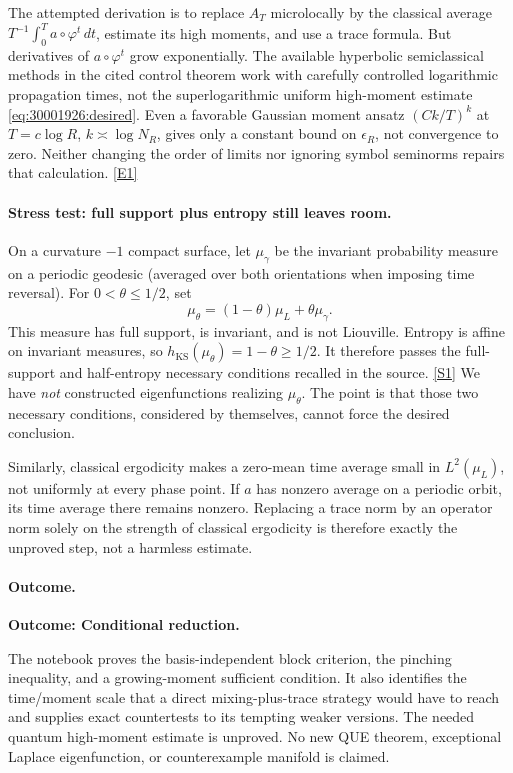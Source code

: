 \documentclass[11pt,a4paper]{article}
\newcommand{\sref}[2]{\hyperlink{source:#1:#2}{[S#2]}}
\newcommand{\eref}[2]{\hyperlink{extra:#1:#2}{[E#2]}}
\numberwithin{equation}{section}
\begin{document}
The attempted derivation is to replace $A_T$ microlocally by the classical
average $T^{-1}\int_0^T a\circ\varphi^t\,dt$, estimate its high moments,
and use a trace formula. But derivatives of $a\circ\varphi^t$ grow
exponentially. The available hyperbolic semiclassical methods in the cited
control theorem work with carefully controlled logarithmic propagation
times, not the superlogarithmic uniform high-moment estimate
\eqref{eq:30001926:desired}. Even a favorable Gaussian moment ansatz
$(Ck/T)^k$ at $T=c\log R$, $k\asymp\log N_R$, gives only a constant bound
on $\epsilon_R$, not convergence to zero. Neither changing the order of
limits nor ignoring symbol seminorms repairs that calculation.
\eref{30001926}{1}

\paragraph{Stress test: full support plus entropy still leaves room.}
On a curvature $-1$ compact surface, let $\mu_\gamma$ be the invariant
probability measure on a periodic geodesic (averaged over both orientations
when imposing time reversal). For $0<\theta\leq1/2$, set
\[
 \mu_\theta=(1-\theta)\mu_L+\theta\mu_\gamma.
\]
This measure has full support, is invariant, and is not Liouville. Entropy
is affine on invariant measures, so
$h_{\mathrm{KS}}(\mu_\theta)=1-\theta\geq1/2$.
It therefore passes the full-support and half-entropy necessary conditions
recalled in the source. \sref{30001926}{1}
We have \emph{not} constructed eigenfunctions realizing $\mu_\theta$.
The point is that those two necessary conditions, considered by themselves,
cannot force the desired conclusion.

Similarly, classical ergodicity makes a zero-mean time average small in
$L^2(\mu_L)$, not uniformly at every phase point. If $a$ has nonzero average
on a periodic orbit, its time average there remains nonzero. Replacing a
trace norm by an operator norm solely on the strength of classical
ergodicity is therefore exactly the unproved step, not a harmless estimate.

\paragraph{Outcome.}
\textbf{Outcome: Conditional reduction.}

The notebook proves the basis-independent block criterion, the pinching
inequality, and a growing-moment sufficient condition. It also identifies
the time/moment scale that a direct mixing-plus-trace strategy would have
to reach and supplies exact countertests to its tempting weaker versions.
The needed quantum high-moment estimate is unproved. No new QUE theorem,
exceptional Laplace eigenfunction, or counterexample manifold is claimed.
\end{document}
